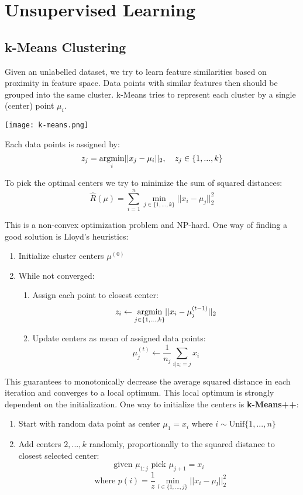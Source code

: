 \section{Unsupervised Learning}

\subsection{k-Means Clustering}

Given an unlabelled dataset, we try to learn feature similarities based on proximity in feature space. Data points with similar features then should be grouped into the same cluster. k-Means tries to represent each cluster by a single (center) point $\mu_i$.

\begin{center}
	\texttt{[image: k-means.png]}
\end{center}

Each data points is assigned by:
$$z_j = \underset{i}{\text{argmin}} ||x_j - \mu_i||_2, \quad z_j \in \{1, ..., k\}$$

To pick the optimal centers we try to minimize the sum of squared distances:
$$\hat{R} (\mu) = \sum_{i=1}^n \min_{j\in \{1,...,k\}} ||x_i - \mu_j||_2^2$$

This is a non-convex optimization problem and NP-hard. One way of finding a good solution is Lloyd's heuristics:
\begin{enumerate}
	\item Initialize cluster centers $\mu^{(0)}$
	\item While not converged:
		\begin{enumerate}
			\item Assign each point to closest center:
				$$z_i \leftarrow \underset{j\in \{1,...,k\}}{\text{argmin}} ||x_i - \mu_j^{(t-1)}||_2$$		
			\item Update centers as mean of assigned data points:
				$$\mu_j^{(t)} \leftarrow \frac{1}{n_j} \sum_{i | z_i = j} x_i$$  	
		\end{enumerate}
\end{enumerate}

This guarantees to monotonically decrease the average squared distance in each iteration and converges to a local optimum. This local optimum is strongly dependent on the initialization. One way to initialize the centers is \textbf{k-Means++}:

\begin{enumerate}
	\item Start with random data point as center $\mu_1 = x_i$ where $i \sim \text{Unif}\{1,...,n\}$
	\item Add centers $2,...,k$ randomly, proportionally to the squared distance to closest selected center:
		$$\text{given } \mu_{1:j} \text{ pick } \mu_{j+1} = x_i$$ $$\text{ where } p(i) = \frac{1}{z} \min_{l \in \{1,...,j\}} ||x_i - \mu_l||_2^2$$
\end{enumerate}

